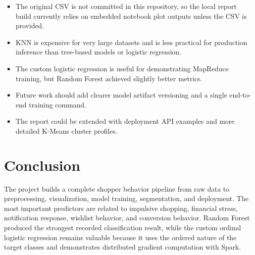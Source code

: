 \documentclass[11pt,a4paper]{article}
\begin{document}
\begin{itemize}
  \item The original CSV is not committed in this repository, so the local report build currently relies on embedded notebook plot outputs unless the CSV is provided.
  \item KNN is expensive for very large datasets and is less practical for production inference than tree-based models or logistic regression.
  \item The custom logistic regression is useful for demonstrating MapReduce training, but Random Forest achieved slightly better metrics.
  \item Future work should add clearer model artifact versioning and a single end-to-end training command.
  \item The report could be extended with deployment API examples and more detailed K-Means cluster profiles.
\end{itemize}

\section{Conclusion}

The project builds a complete shopper behavior pipeline from raw data to preprocessing, visualization, model training, segmentation, and deployment. The most important predictors are related to impulsive shopping, financial stress, notification response, wishlist behavior, and conversion behavior. Random Forest produced the strongest recorded classification result, while the custom ordinal logistic regression remains valuable because it uses the ordered nature of the target classes and demonstrates distributed gradient computation with Spark.
\end{document}
